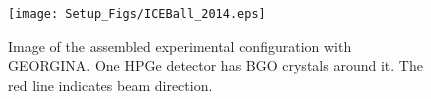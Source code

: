 \begin{figure}
    \centering
    \texttt{[image: Setup\_Figs/ICEBall\_2014.eps]}
    \caption{Image of the assembled experimental configuration with GEORGINA. One HPGe detector has BGO crystals around it. The red line indicates beam direction.}
    \label{fig:georgina_config}
\end{figure}